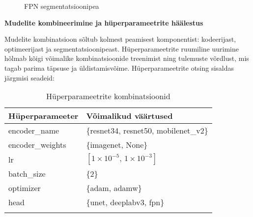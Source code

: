 \begin{figure}[H]
    \caption{FPN segmentatsioonipea}
    \label{fig:FPNsegmentatsioonipea}
\end{figure}


\textbf{Mudelite kombineerimine ja hüperparameetrite häälestus}

Mudelite kombinatsioon sõltub kolmest peamisest komponentist: kodeerijast, optimeerijast ja segmentatsioonipeast. Hüperparameetrite ruumiline uurimine hõlmab kõigi võimalike kombinatsioonide treenimist ning tulemuste võrdlust, mis tagab parima täpsuse ja üldistamisvõime. Hüperparameetrite otsing sisaldas järgmisi seadeid:

\begin{longtable}{ll}
    \hline
    \textbf{Hüperparameeter} & \textbf{Võimalikud väärtused} \\
    \hline
    encoder\_name      & \{resnet34, resnet50, mobilenet\_v2\} \\
    encoder\_weights   & \{imagenet, None\} \\
    lr                 & $[1\times10^{-5},\,1\times10^{-3}]$ \\
    batch\_size        & \{2\} \\
    optimizer          & \{adam, adamw\} \\
    head               & \{unet, deeplabv3, fpn\} \\
    \hline
    \caption{Hüperparameetrite kombinatsioonid}
    \label{tab:hyperparameter_kombinatsioonid}
\end{longtable}


